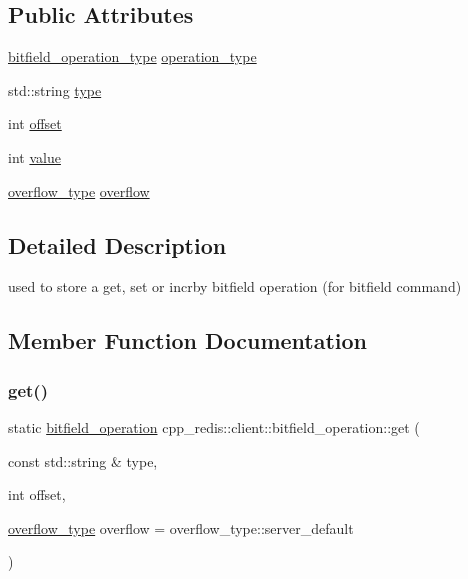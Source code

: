 \subsection*{Public Attributes}
\begin{DoxyCompactItemize}
\item 
\mbox{\hyperlink{classcpp__redis_1_1client_a2e2023534299541da0a659802e2f087d}{bitfield\+\_\+operation\+\_\+type}} \mbox{\hyperlink{structcpp__redis_1_1client_1_1bitfield__operation_a4f3462e48d5f01b6fcd1605d6de21a3e}{operation\+\_\+type}}
\item 
std\+::string \mbox{\hyperlink{structcpp__redis_1_1client_1_1bitfield__operation_adbbf30e5138d0524940d536b2bc71480}{type}}
\item 
int \mbox{\hyperlink{structcpp__redis_1_1client_1_1bitfield__operation_a8a4e83ddbac5c3500c6960f54e736598}{offset}}
\item 
int \mbox{\hyperlink{structcpp__redis_1_1client_1_1bitfield__operation_a8104441f6b9ee7cbf5e6ee6c17c7445c}{value}}
\item 
\mbox{\hyperlink{classcpp__redis_1_1client_a4119182ad3a01c1bb626a174375e114a}{overflow\+\_\+type}} \mbox{\hyperlink{structcpp__redis_1_1client_1_1bitfield__operation_a2f478e17655a249080178034faa0f6f2}{overflow}}
\end{DoxyCompactItemize}


\subsection{Detailed Description}
used to store a get, set or incrby bitfield operation (for bitfield command) 

\subsection{Member Function Documentation}
\mbox{\label{structcpp__redis_1_1client_1_1bitfield__operation_a93d3f7ab6b6bae82ac209bb49374d788}} 
\subsubsection{\texorpdfstring{get()}{get()}}
{\footnotesize\ttfamily static \mbox{\hyperlink{structcpp__redis_1_1client_1_1bitfield__operation}{bitfield\+\_\+operation}} cpp\+\_\+redis\+::client\+::bitfield\+\_\+operation\+::get (\begin{DoxyParamCaption}\item[{const std\+::string \&}]{type,  }\item[{int}]{offset,  }\item[{\mbox{\hyperlink{classcpp__redis_1_1client_a4119182ad3a01c1bb626a174375e114a}{overflow\+\_\+type}}}]{overflow = {\ttfamily overflow\+\_\+type\+:\+:server\+\_\+default} }\end{DoxyParamCaption})\hspace{0.3cm}{\ttfamily [static]}}

